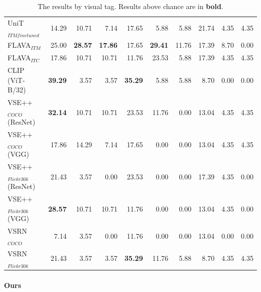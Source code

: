 \begin{table}[ht]
\begin{adjustbox}{max width=\textwidth}
\begin{tabular}{l|rrr|rrr|rrr}
 UniT$_{ITM finetuned}$       & 14.29          & 10.71          & 7.14           & 17.65          & 5.88           & 5.88           & 21.74          & 4.35           & 4.35           \\
 FLAVA$_{ITM}$                & 25.00          & \textbf{28.57} & \textbf{17.86} & 17.65          & \textbf{29.41} & 11.76 & 17.39          &  8.70 &  0.00 \\
 FLAVA$_{ITC}$        & 17.86          & 10.71          & 10.71          & 11.76          & 23.53          & 5.88           & 17.39          & 4.35           &  4.35 \\
 CLIP (ViT-B/32)              & \textbf{39.29} & 3.57           & 3.57           & \textbf{35.29} & 5.88           & 5.88           & 8.70           & 0.00           & 0.00           \\
 VSE++$_{COCO}$ (ResNet)      & \textbf{32.14} & 10.71          & 10.71          & 23.53          & 11.76          & 0.00           & 13.04          & 4.35           & 4.35           \\
 VSE++$_{COCO}$ (VGG)         & 17.86          & 14.29          & 7.14           & 17.65          & 0.00           & 0.00           & 13.04          & 4.35           & 4.35           \\
 VSE++$_{Flickr30k}$ (ResNet) & 21.43          & 3.57           & 0.00           & 23.53          & 0.00           & 0.00           & 17.39          & 4.35           & 0.00           \\
 VSE++$_{Flickr30k}$ (VGG)    & \textbf{28.57} & 10.71          & 10.71          & 11.76          & 0.00           & 0.00           & 13.04          & 4.35           & 0.00           \\
 VSRN$_{COCO}$                & 7.14           & 3.57           & 0.00           & 11.76          & 0.00           & 0.00           & 13.04          & 0.00           & 0.00           \\
 VSRN$_{Flickr30k}$           & 21.43          & 3.57           & 3.57           & \textbf{35.29} & 11.76          & 5.88           & 8.70           & 4.35           & 4.35           \\
    \bottomrule
  \end{tabular}
  \end{adjustbox}
  \caption{The results by visual tag. Results above chance are in \textbf{bold}.}
    \label{tab:results-by-visual-tag-baseline}
\end{table}

\paragraph{Ours}

